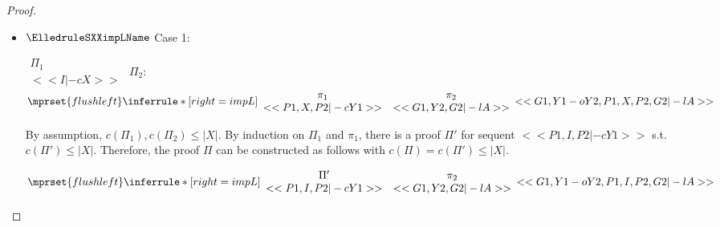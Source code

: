 \begin{proof}
\begin{enumerate}
\begin{itemize}
  \item $\ElledruleSXXimpLName$ Case 1:
      \begin{center}
        \scriptsize
        \begin{math}
          \begin{array}{c}
            \Pi_1 \\
            {<<I |-c X>>}
          \end{array}
        \end{math}
        \qquad\qquad
        $\Pi_2$:
        \begin{math}
          $$\mprset{flushleft}
          \inferrule* [right={\tiny impL}] {
            {
              \begin{array}{cc}
                \pi_1 & \pi_2 \\
                {<<P1, X, P2 |-c Y1>>} & {<<G1, Y2, G2 |-l A>>}
              \end{array}
            }
          }{<<G1, Y1 -o Y2, P1, X, P2, G2 |-l A>>}
        \end{math}
      \end{center}
      By assumption, $c(\Pi_1),c(\Pi_2)\leq |X|$. By induction on $\Pi_1$ and $\pi_1$, there is
      a proof $\Pi'$ for sequent $<<P1, I, P2 |-c Y1>>$ s.t. $c(\Pi') \leq |X|$. Therefore, the
      proof $\Pi$ can be constructed as follows with $c(\Pi) = c(\Pi') \leq |X|$.
      \begin{center}
        \scriptsize
        \begin{math}
          $$\mprset{flushleft}
          \inferrule* [right={\tiny impL}] {
            {
              \begin{array}{cc}
                \Pi' & \pi_2 \\
                {<<P1, I, P2 |-c Y1>>} & {<<G1, Y2, G2 |-l A>>}
              \end{array}
            }
          }{<<G1, Y1 -o Y2, P1, I, P2, G2 |-l A>>}
        \end{math}
      \end{center}


\end{itemize}
\end{enumerate}
\end{proof}
